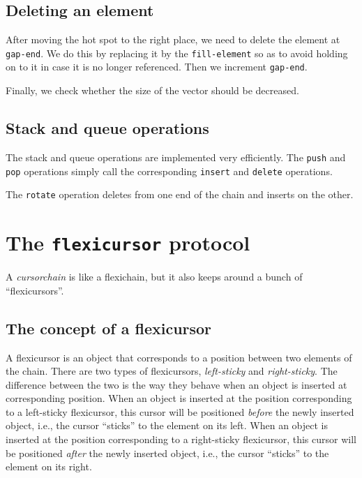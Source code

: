 \documentclass[11pt]{article}
\begin{document}
\subsection{Deleting an element}

After moving the hot spot to the right place, we need to delete the
element at \texttt{gap-end}.  We do this by replacing it by the
\texttt{fill-element} so as to avoid holding on to it in case it is no
longer referenced.  Then we increment \texttt{gap-end}.

Finally, we check whether the size of the vector should be decreased. 

\subsection{Stack and queue operations}

The stack and queue operations are implemented very efficiently.  The
\texttt{push} and \texttt{pop} operations simply call the
corresponding \texttt{insert} and \texttt{delete} operations. 

The \texttt{rotate} operation deletes from one end of the chain and
inserts on the other. 

\section{The \texttt{flexicursor} protocol}

A \textit{cursorchain} is like a flexichain, but it also keeps around
a bunch of ``flexicursors''.

\subsection{The concept of a flexicursor} 

A flexicursor is an object that corresponds to a position between two
elements of the chain.  There are two types of flexicursors,
\emph{left-sticky} and \emph{right-sticky}.  The difference between
the two is the way they behave when an object is inserted at
corresponding position. When an object is inserted at the position
corresponding to a left-sticky flexicursor, this cursor will be
positioned \emph{before} the newly inserted object, i.e., the cursor
``sticks'' to the element on its left.  When an object is inserted at
the position corresponding to a right-sticky flexicursor, this cursor
will be positioned \emph{after} the newly inserted object, i.e., the
cursor ``sticks'' to the element on its right.
\end{document}
